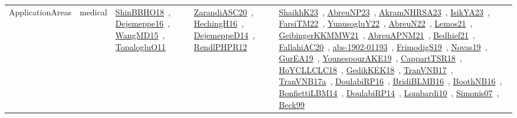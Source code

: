 {\begin{longtable}{lp{3cm}>{\raggedright\arraybackslash}p{6cm}>{\raggedright\arraybackslash}p{6cm}>{\raggedright\arraybackslash}p{8cm}}
ApplicationAreas & medical & \href{works/ShinBBHO18.pdf}{ShinBBHO18}~\cite{ShinBBHO18}, \href{works/Dejemeppe16.pdf}{Dejemeppe16}~\cite{Dejemeppe16}, \href{works/WangMD15.pdf}{WangMD15}~\cite{WangMD15}, \href{works/TopalogluO11.pdf}{TopalogluO11}~\cite{TopalogluO11} & \href{works/ZarandiASC20.pdf}{ZarandiASC20}~\cite{ZarandiASC20}, \href{works/HechingH16.pdf}{HechingH16}~\cite{HechingH16}, \href{works/DejemeppeD14.pdf}{DejemeppeD14}~\cite{DejemeppeD14}, \href{works/RendlPHPR12.pdf}{RendlPHPR12}~\cite{RendlPHPR12} & \href{works/ShaikhK23.pdf}{ShaikhK23}~\cite{ShaikhK23}, \href{works/AbreuNP23.pdf}{AbreuNP23}~\cite{AbreuNP23}, \href{works/AkramNHRSA23.pdf}{AkramNHRSA23}~\cite{AkramNHRSA23}, \href{works/IsikYA23.pdf}{IsikYA23}~\cite{IsikYA23}, \href{works/FarsiTM22.pdf}{FarsiTM22}~\cite{FarsiTM22}, \href{works/YunusogluY22.pdf}{YunusogluY22}~\cite{YunusogluY22}, \href{works/AbreuN22.pdf}{AbreuN22}~\cite{AbreuN22}, \href{works/Lemos21.pdf}{Lemos21}~\cite{Lemos21}, \href{works/GeibingerKKMMW21.pdf}{GeibingerKKMMW21}~\cite{GeibingerKKMMW21}, \href{works/AbreuAPNM21.pdf}{AbreuAPNM21}~\cite{AbreuAPNM21}, \href{works/Bedhief21.pdf}{Bedhief21}~\cite{Bedhief21}, \href{works/FallahiAC20.pdf}{FallahiAC20}~\cite{FallahiAC20}, \href{works/abs-1902-01193.pdf}{abs-1902-01193}~\cite{abs-1902-01193}, \href{works/FrimodigS19.pdf}{FrimodigS19}~\cite{FrimodigS19}, \href{works/Novas19.pdf}{Novas19}~\cite{Novas19}, \href{works/GurEA19.pdf}{GurEA19}~\cite{GurEA19}, \href{works/YounespourAKE19.pdf}{YounespourAKE19}~\cite{YounespourAKE19}, \href{works/CappartTSR18.pdf}{CappartTSR18}~\cite{CappartTSR18}, \href{works/HoYCLLCLC18.pdf}{HoYCLLCLC18}~\cite{HoYCLLCLC18}, \href{works/GedikKEK18.pdf}{GedikKEK18}~\cite{GedikKEK18}, \href{works/TranVNB17.pdf}{TranVNB17}~\cite{TranVNB17}, \href{works/TranVNB17a.pdf}{TranVNB17a}~\cite{TranVNB17a}, \href{works/DoulabiRP16.pdf}{DoulabiRP16}~\cite{DoulabiRP16}, \href{works/BridiBLMB16.pdf}{BridiBLMB16}~\cite{BridiBLMB16}, \href{works/BoothNB16.pdf}{BoothNB16}~\cite{BoothNB16}, \href{works/BonfiettiLBM14.pdf}{BonfiettiLBM14}~\cite{BonfiettiLBM14}, \href{works/DoulabiRP14.pdf}{DoulabiRP14}~\cite{DoulabiRP14}, \href{works/Lombardi10.pdf}{Lombardi10}~\cite{Lombardi10}, \href{works/Simonis07.pdf}{Simonis07}~\cite{Simonis07}, \href{works/Beck99.pdf}{Beck99}~\cite{Beck99}\\

\end{longtable}}
